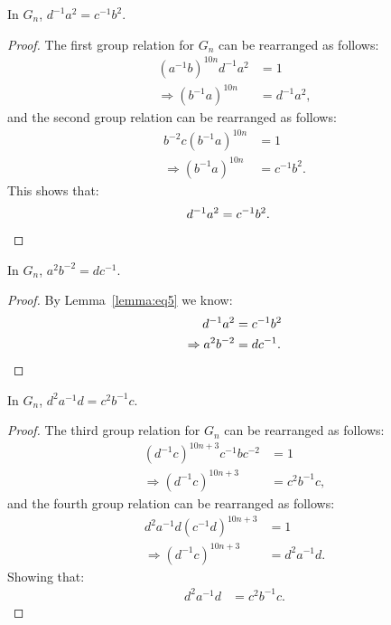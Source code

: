 \begin{lemma} In $G_n$, $d^{-1}a^{2}=c^{-1}b^{2}$.
\label{lemma:eq5}
\end{lemma}
\begin{proof} The first group relation for $G_n$ can be rearranged as follows:
\begin{align}
(a^{-1}b)^{10n}d^{-1}a^{2}&=1\nonumber{}\\
\Rightarrow{}(b^{-1}a)^{10n}&=d^{-1}a^{2},\label{eq1:2}
\end{align}
and the second group relation can be rearranged as follows:
\begin{align}
b^{-2}c(b^{-1}a)^{10n}&=1\nonumber{}\\
\Rightarrow{}(b^{-1}a)^{10n}&=c^{-1}b^{2}.\label{eq2:2}
\end{align}
This shows that:
\begin{align*}
d^{-1}a^{2}&=c^{-1}b^{2}.\qedhere
\end{align*}
\end{proof}

\begin{corollary} In $G_n$, $a^{2}b^{-2}=dc^{-1}$.
\label{corollary:eq6}
\end{corollary}
\begin{proof}By Lemma~\ref{lemma:eq5} we know:
\begin{align*}
d^{-1}a^{2}&=c^{-1}b^{2}\\
\Rightarrow{}a^{2}b^{-2}&=dc^{-1}.\qedhere
\end{align*}
\end{proof}

\begin{lemma} In $G_n$, $d^{2}a^{-1}d=c^{2}b^{-1}c$.
\label{lemma:eq7}
\end{lemma}
\begin{proof}
The third group relation for $G_n$ can be rearranged as follows:
\begin{align*}
(d^{-1}c)^{10n+3}c^{-1}bc^{-2}&=1\\
\Rightarrow{}(d^{-1}c)^{10n+3}&=c^{2}b^{-1}c,
\end{align*}
and the fourth group relation can be rearranged as follows:
\begin{align*}
d^{2}a^{-1}d(c^{-1}d)^{10n+3}&=1\\
\Rightarrow{}(d^{-1}c)^{10n+3}&=d^{2}a^{-1}d.
\end{align*}
Showing that:
\begin{align}
\label{eq7}d^{2}a^{-1}d&=c^{2}b^{-1}c.
\end{align}
\end{proof}

